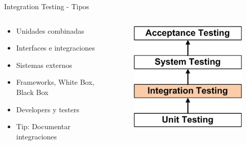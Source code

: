 \documentclass[aspectratio=169]{beamer}
\begin{document}
\begin{frame}{Integration Testing - Tipos}
\begin{columns}[T]
	\begin{column}[T]{6cm}
		\begin{itemize}
			\item Unidades combinadas
			\item Interfaces e integraciones
			\item Sistemas externos
			\item Frameworks, White Box, Black Box
			\item Developers y testers
			\item Tip: Documentar integraciones
		\end{itemize}
	\end{column}
	\begin{column}[T]{4cm} %
		\begin{figure}
			\centering
			\includegraphics[width=0.8\linewidth]{Images/integrationtesting}
		\end{figure}
	\end{column}
\end{columns}
\end{frame}
\end{document}
